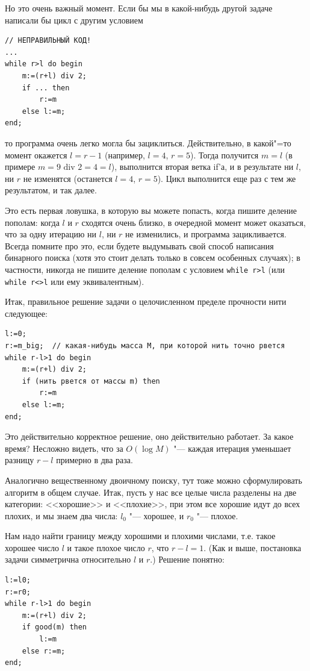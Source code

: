 \documentclass[a4paper,10pt]{problems}
\begin{document}
Но это очень важный момент. Если бы мы в какой-нибудь другой задаче написали бы цикл с другим условием
\begin{codesampleo}\begin{verbatim}
// НЕПРАВИЛЬНЫЙ КОД!
...
while r>l do begin    
    m:=(r+l) div 2;
    if ... then
        r:=m
    else l:=m;
end;
\end{verbatim}
\end{codesampleo}
то программа очень легко могла бы зациклиться. Действительно, в какой"=то момент окажется $l=r-1$ (например, $l=4$, $r=5$).
Тогда получится $m=l$ (в примере $m=9\mbox{ div } 2=4=l$), выполнится вторая ветка if'а, и в результате ни $l$, ни $r$ не изменятся
(останется $l=4$, $r=5$). Цикл выполнится еще раз с тем же результатом, и так далее.

Это есть первая ловушка, в которую вы можете попасть, когда пишите деление пополам: когда $l$ и $r$ сходятся очень близко, 
в очередной момент может оказаться, что за одну итерацию ни $l$, ни $r$ не изменились, и программа зацикливается.
Всегда помните про это, если будете выдумывать свой способ написания бинарного поиска (хотя это стоит делать только в совсем особенных случаях);
в частности, никогда не пишите деление пополам с условием \verb`while r>l` (или \verb`while r<>l` или ему эквивалентным).

Итак, правильное решение задачи о целочисленном пределе прочности нити следующее:
\begin{codesampleo}\begin{verbatim}
l:=0;
r:=m_big;  // какая-нибудь масса M, при которой нить точно рвется
while r-l>1 do begin    
    m:=(r+l) div 2;
    if (нить рвется от массы m) then
        r:=m
    else l:=m;
end;
\end{verbatim}
\end{codesampleo}

Это действительно корректное решение, оно действительно работает. За какое время? 
Несложно видеть, что за $O(\log M)$ "--- каждая итерация уменьшает разницу $r-l$ примерно в два раза.

 Аналогично вещественному двоичному поиску, тут тоже можно сформулировать алгоритм в общем случае.
Итак, пусть у нас все целые числа разделены на две категории: <<хорошие>> и <<плохие>>, при этом все хорошие идут до всех плохих,
и мы знаем два числа: $l_0$ "--- хорошее, и $r_0$ "--- плохое. 

Нам надо найти границу между хорошими и плохими числами, т.е. такое хорошее число $l$ и такое плохое число $r$, что $r-l=1$. 
(Как и выше, постановка задачи симметрична относительно $l$ и $r$.)
Решение понятно:
\begin{codesampleo}\begin{verbatim}
l:=l0;
r:=r0;  
while r-l>1 do begin    
    m:=(r+l) div 2;
    if good(m) then
        l:=m
    else r:=m;
end;
\end{verbatim}
\end{codesampleo}
\end{document}
